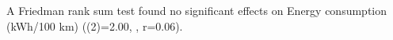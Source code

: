 A Friedman rank sum test found no significant effects on Energy consumption (kWh/100 km) (\chisq(2)=2.00, , r=0.06). 
